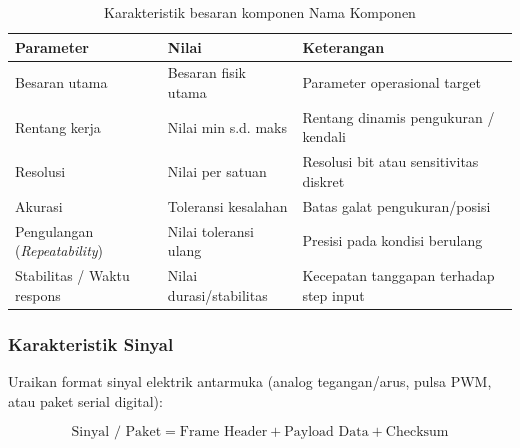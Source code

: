 \begin{table}[H]
	\centering
	\caption{Karakteristik besaran komponen Nama Komponen}
	\label{tab:nama_komponen_karakteristik_besaran}
	\small
	\begin{tabularx}{\textwidth}{@{}lXX@{}}
		\toprule
		Parameter                            & Nilai                   & Keterangan                           \\
		\midrule
		Besaran utama                        & Besaran fisik utama     & Parameter operasional target         \\
		Rentang kerja                        & Nilai min s.d. maks     & Rentang dinamis pengukuran / kendali \\
		Resolusi                             & Nilai per satuan        & Resolusi bit atau sensitivitas diskret \\
		Akurasi                              & Toleransi kesalahan     & Batas galat pengukuran/posisi        \\
		Pengulangan (\textit{Repeatability}) & Nilai toleransi ulang   & Presisi pada kondisi berulang        \\
		Stabilitas / Waktu respons           & Nilai durasi/stabilitas & Kecepatan tanggapan terhadap step input \\
		\bottomrule
	\end{tabularx}
\end{table}

\subsubsection{Karakteristik Sinyal}
Uraikan format sinyal elektrik antarmuka (analog tegangan/arus, pulsa PWM, atau paket serial digital):

\begin{equation}
	\text{Sinyal / Paket} = \text{Frame Header} + \text{Payload Data} + \text{Checksum}
	\label{eq:nama_komponen_packet}
\end{equation}

